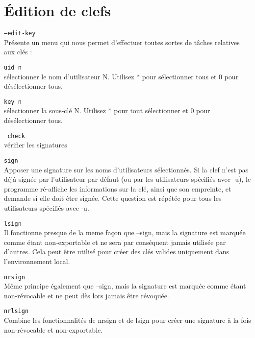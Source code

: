 \section{Édition de clefs}

 \texttt{--edit-key}\\
              Présente un menu qui nous permet d'effectuer toutes sortes de tâches relatives aux clés :



              \texttt{uid n }\\ 
               sélectionner le nom d'utilisateur N.
             Utilisez * pour sélectionner tous et 0 pour désélectionner tous.


              \texttt{key n  }\\ 
               sélectionner la sous-clé N. Utilisez * pour
              tout sélectionner et 0 pour désélectionner tous.
              
              \texttt{ check }\\ 
              
              vérifier les signatures


               \texttt{sign }\\   
              Apposer une signature sur les noms d'utilisateurs sélectionnés. Si la clef n'est pas déjà signée
              par l'utilisateur par défaut (ou par les utilisateurs spécifiés avec -u), le programme ré-affiche 
              les informations sur la clé, ainsi que son empreinte, et demande si elle doit être signée. 
              Cette question est répétée pour tous les utilisateurs spécifiés avec -u.


               \texttt{lsign }\\  
              Il fonctionne presque de la meme façon que --sign, mais la signature est marquée comme étant non-exportable et ne sera par conséquent 
            jamais utilisée par d'autres. Cela peut être utilisé pour créer des clés valides uniquement dans l'environnement local.
              
              \texttt{nrsign }\\ 
             Même principe également que --sign, mais la signature est marquée comme étant non-révocable et 
             ne peut dès lors jamais être révoquée.
            
              \texttt{nrlsign}\\ 
            Combine les fonctionnalités de nrsign et de lsign pour créer une signature à la fois non-révocable et non-exportable.


